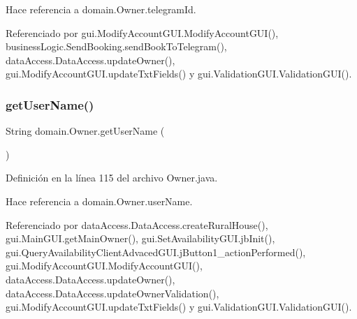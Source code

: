 Hace referencia a domain.\+Owner.\+telegram\+Id.



Referenciado por gui.\+Modify\+Account\+G\+U\+I.\+Modify\+Account\+G\+U\+I(), business\+Logic.\+Send\+Booking.\+send\+Book\+To\+Telegram(), data\+Access.\+Data\+Access.\+update\+Owner(), gui.\+Modify\+Account\+G\+U\+I.\+update\+Txt\+Fields() y gui.\+Validation\+G\+U\+I.\+Validation\+G\+U\+I().

\mbox{\label{classdomain_1_1_owner_a912ac7ca2dffa65d6b4c26540cc33605}} 
\subsubsection{\texorpdfstring{getUserName()}{getUserName()}}
{\footnotesize\ttfamily String domain.\+Owner.\+get\+User\+Name (\begin{DoxyParamCaption}{ }\end{DoxyParamCaption})}



Definición en la línea 115 del archivo Owner.\+java.


\begin{DoxyCode}{0}

\end{DoxyCode}


Hace referencia a domain.\+Owner.\+user\+Name.



Referenciado por data\+Access.\+Data\+Access.\+create\+Rural\+House(), gui.\+Main\+G\+U\+I.\+get\+Main\+Owner(), gui.\+Set\+Availability\+G\+U\+I.\+jb\+Init(), gui.\+Query\+Availability\+Client\+Advaced\+G\+U\+I.\+j\+Button1\+\_\+action\+Performed(), gui.\+Modify\+Account\+G\+U\+I.\+Modify\+Account\+G\+U\+I(), data\+Access.\+Data\+Access.\+update\+Owner(), data\+Access.\+Data\+Access.\+update\+Owner\+Validation(), gui.\+Modify\+Account\+G\+U\+I.\+update\+Txt\+Fields() y gui.\+Validation\+G\+U\+I.\+Validation\+G\+U\+I().

\mbox{\label{classdomain_1_1_owner_a2265630ba75fb938b09b243833117069}} 
